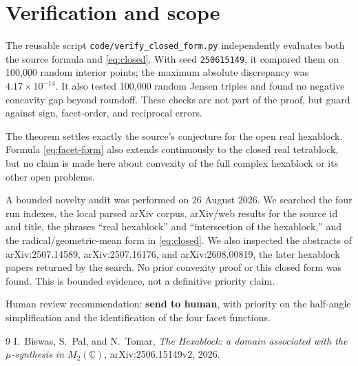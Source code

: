 \documentclass[11pt]{article}
\begin{document}
\section{Verification and scope}

The reusable script \texttt{code/verify\_closed\_form.py} independently
evaluates both the source formula and \eqref{eq:closed}.  With seed
\texttt{250615149}, it compared them on 100,000 random interior points; the
maximum absolute discrepancy was \(4.17\times10^{-14}\).  It also tested
100,000 random Jensen triples and found no negative concavity gap beyond
roundoff.  These checks are not part of the proof, but guard against sign,
facet-order, and reciprocal errors.

The theorem settles exactly the source's conjecture for the open real
hexablock.  Formula \eqref{eq:facet-form} also extends continuously to the
closed real tetrablock, but no claim is made here about convexity of the full
complex hexablock or its other open problems.

A bounded novelty audit was performed on 26 August 2026.  We searched the four
run indexes, the local parsed arXiv corpus, arXiv/web results for the source id
and title, the phrases ``real hexablock'' and ``intersection of the
hexablock,'' and the radical/geometric-mean form in \eqref{eq:closed}.  We
also inspected the abstracts of arXiv:2507.14589, arXiv:2507.16176, and
arXiv:2608.00819, the later hexablock papers returned by the search.  No prior
convexity proof or this closed form was found.  This is bounded evidence, not
a definitive priority claim.

Human review recommendation: \textbf{send to human}, with priority on the
half-angle simplification and the identification of the four facet functions.

\begin{thebibliography}{9}
I.~Biswas, S.~Pal, and N.~Tomar,
\emph{The Hexablock: a domain associated with the \(\mu\)-synthesis in
\(M_2(\mathbb C)\)}, arXiv:2506.15149v2, 2026.
\end{thebibliography}
\end{document}
